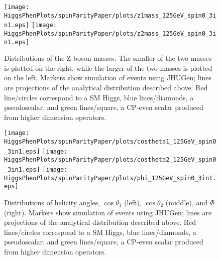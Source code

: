 \begin{figure}
\begin{center}
\texttt{[image: HiggsPhenPlots/spinParityPaper/plots/z1mass\_125GeV\_spin0\_3in1.eps]}
\texttt{[image: HiggsPhenPlots/spinParityPaper/plots/z2mass\_125GeV\_spin0\_3in1.eps]}
\caption{Distributions of the Z boson masses.  The smaller of the two masses is
plotted on the right, while the larger of the two masses is plotted on the
left. Markers show simulation of events using JHUGen; lines are projections
of the analytical distribution described above.  Red line/circles correspond
to a SM Higgs, blue lines/diamonds, a pseudoscalar, and green lines/square, 
a CP-even scalar produced from higher dimension operators.}
\label{fig:ScalarMasses}
\end{center}
\end{figure}

\begin{figure}
\begin{center}
\texttt{[image: HiggsPhenPlots/spinParityPaper/plots/costheta1\_125GeV\_spin0\_3in1.eps]}
\texttt{[image: HiggsPhenPlots/spinParityPaper/plots/costheta2\_125GeV\_spin0\_3in1.eps]}
\texttt{[image: HiggsPhenPlots/spinParityPaper/plots/phi\_125GeV\_spin0\_3in1.eps]}
\caption{Distributions of helicity angles, $\cos\theta_1$ (left), 
$\cos\theta_2$ (middle), and $\Phi$ (right). Markers show simulation of 
events using JHUGen; lines are projections
of the analytical distribution described above.  Red lines/circles correspond
to a SM Higgs, blue lines/diamonds, a pseudoscalar, and green lines/square, 
a CP-even scalar produced from higher dimension operators.}
\label{fig:ScalarHelicityAngles}
\end{center}
\end{figure}

